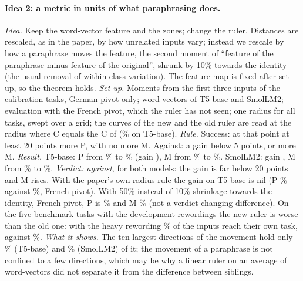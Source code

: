 \paragraph{Idea 2: a metric in units of what paraphrasing does.}
\emph{Idea.} Keep the word-vector feature and the zones; change the ruler. Distances are rescaled, as
in the paper, by how unrelated inputs vary; instead we rescale by how a paraphrase moves the
feature, the second moment of ``feature of the paraphrase minus feature of the original'', shrunk
by 10\% towards the identity (the usual removal of within-class variation). The feature map is fixed after set-up, so the theorem holds.
\emph{Set-up.} Moments from the first three inputs of the \WidenTasksCal{} calibration tasks, German pivot only;
word-vectors of T5-base and SmolLM2; evaluation with the French pivot, which the ruler has not seen;
one radius for all tasks, swept over a grid; the curves of the new and the old ruler are read at the
radius where \textsf{C} equals the \textsf{C} of \cert{} (\WidenRulerTfiveC{}\% on T5-base).
\emph{Rule.} Success: at that point at least 20 points more \textsf{P}, with no more \textsf{M}. Against: a gain below 5
points, or more \textsf{M}.
\emph{Result.} T5-base: \textsf{P} from \WidenRulerTfivePOld{}\% to \WidenRulerTfivePNew{}\% (gain
\WidenRulerTfiveGain{}), \textsf{M} from \WidenRulerTfiveMOld{}\% to \WidenRulerTfiveMNew{}\%. SmolLM2: gain
\WidenRulerSmolGain{}, \textsf{M} from \WidenRulerSmolMOld{}\% to \WidenRulerSmolMNew{}\%. \emph{Verdict: against}, for
both models: the gain is far below 20 points and \textsf{M} rises. With the paper's own radius rule the gain
on T5-base is nil (\textsf{P} \WidenRulerTfiveRuleBOld{}\% against \WidenRulerTfiveRuleBNew{}\%, French pivot). With 50\% instead of 10\% shrinkage towards the identity, French pivot, \textsf{P} is \WidenRulerHalfP{}\% and \textsf{M} \WidenRulerHalfM{}\% (not a verdict-changing difference). On the five
benchmark tasks with the development rewordings the new ruler is worse than the old one: with the heavy rewording
\WidenRulerHeavyNew{}\% of the inputs reach their own task, against \WidenRulerHeavyOld{}\%.
\emph{What it shows.} The ten largest directions of the movement hold only \WidenRulerTopTenTfive{}\% (T5-base)
and \WidenRulerTopTenSmol{}\% (SmolLM2) of it; the movement of a paraphrase is not confined to a few
directions, which may be why a linear ruler on an average of word-vectors did not separate it from the difference
between siblings.

